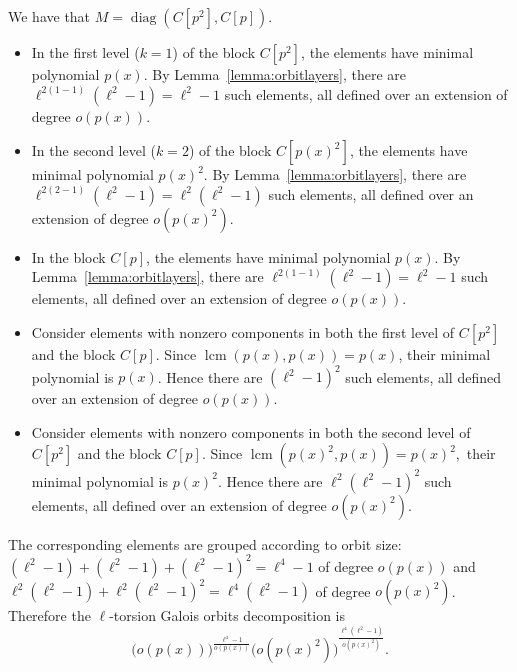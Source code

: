 \documentclass[11pt,a4paper]{article}
\theoremstyle{plain}
\theoremstyle{definition}
\theoremstyle{remark}
\begin{document}
We have that $M = \operatorname{diag}(C[p^2], C[p])$.
\begin{itemize}
    \item In the first level ($k=1$) of the block $C[p^2]$, the elements have minimal polynomial $p(x)$. By Lemma~\ref{lemma:orbitlayers}, there are $ \ell^{2(1-1)}(\ell^2-1)=\ell^2-1$
    such elements, all defined over an extension of degree $o(p(x))$.
    \item In the second level ($k=2$) of the block $C[p(x)^2]$, the elements have minimal polynomial $p(x)^2$. By Lemma~\ref{lemma:orbitlayers}, there are $    \ell^{2(2-1)}(\ell^2-1)=\ell^2(\ell^2-1)$
    such elements, all defined over an extension of degree $o(p(x)^2)$.
    \item In the block $C[p]$, the elements have minimal polynomial $p(x)$. By Lemma~\ref{lemma:orbitlayers}, there are
$\ell^{2(1-1)}(\ell^2-1)=\ell^2-1$
    such elements, all defined over an extension of degree $o(p(x))$.
    \item Consider elements with nonzero components in both the first level of $C[p^2]$ and the block $C[p]$. Since $    \operatorname{lcm}(p(x),p(x))=p(x)$,
    their minimal polynomial is $p(x)$. Hence there are
     $(\ell^2-1)^2$
    such elements, all defined over an extension of degree $o(p(x))$.
    \item Consider elements with nonzero components in both the second level of $C[p^2]$ and the block $C[p]$. Since $    \operatorname{lcm}(p(x)^2,p(x))=p(x)^2,$
    their minimal polynomial is $p(x)^2$. Hence there are $    \ell^2(\ell^2-1)^2$
    such elements, all defined over an extension of degree $o(p(x)^2)$.
\end{itemize}
The corresponding elements are grouped according to orbit size:
$(\ell^2-1)+(\ell^2-1)+(\ell^2-1)^2
=\ell^4-1$ of degree $o(p(x))$ and
$\ell^2(\ell^2-1)+\ell^2(\ell^2-1)^2
=
\ell^4(\ell^2-1)$ of degree $o(p(x)^2)$.  \\
Therefore the $\ell$-torsion Galois orbits  decomposition is  
\[
\bigl(o(p(x))\bigr)^{\frac{\ell^4-1}{o(p(x))}}
\bigl(o(p(x)^2)\bigr)^{\frac{\ell^4(\ell^2-1)}{o(p(x)^2)}}.
\]
\end{document}
